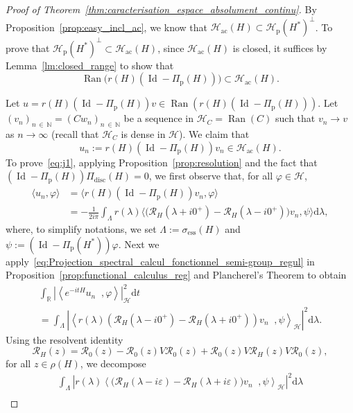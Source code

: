\documentclass[10pt]{amsart}
\theoremstyle{definition}\newtheorem{defi}[theo]{Definition}\newtheorem{rema}[theo]{Remark}\newtheorem{exam}[theo]{Example}\newtheorem{exem}[theo]{Example}\newtheorem{nota}[theo]{Notation}
\newcommand{\Hi}{\mathcal{H}}
\newcommand{\R}{\mathbb{R}}
\newcommand{\N}{\mathbb{N}}
\newcommand{\ess}{\mathrm{ess}}
\newcommand{\rmp}{\mathrm{p}}
\newcommand{\acr}{\mathrm{ac}}
\newcommand{\rmd}{\mathrm{d}}
\newcommand{\disc}{\mathrm{disc}}
\newcommand{\scal}[2]{\left\langle{#1} \middle., {#2}\right\rangle}
\newcommand{\abso}[1]{\left|{#1}\right|}
\newcommand{\Res}{\mathcal{R}}
\DeclareMathOperator{\Ran}{Ran}
\DeclareMathOperator{\Id}{Id}
\begin{document}
\begin{proof}[Proof of Theorem~\ref{thm:caracterisation_espace_absolument_continu}]
By Proposition~\ref{prop:easy_incl_ac}, we know that $\Hi_\acr(H)\subset\Hi_\rmp(H^*)^\perp$. To prove that $\Hi_\rmp(H^*)^\perp\subset\Hi_\acr(H)$, since $\Hi_\acr(H)$ is closed, it suffices by Lemma~\ref{lm:closed_range} to show that
\begin{equation*}
\Ran\big(r(H)\left(\Id-\Pi_\rmp(H)\right)\big)\subset\Hi_\acr(H).
\end{equation*}

Let $u=r(H)(\Id-\Pi_\rmp(H))v \in \Ran(r(H)(\Id-\Pi_\rmp(H)))$. Let $(v_n)_{n\,\in\,\N}=(Cw_n)_{n\,\in\,\N}$ be a sequence in $\Hi_C=\Ran(C)$ such that $v_n\to v$ as $n\to\infty$ (recall that $\Hi_C$ is dense in $\Hi$). We claim that
\begin{equation}\label{eq:j1}
u_n:=r(H)\left(\Id-\Pi_{\rmp}(H)\right)v_n\in\Hi_\acr(H).
\end{equation}
To prove~\eqref{eq:j1}, applying Proposition~\ref{prop:resolution} and the fact that $(\Id-\Pi_{\rmp}(H))\Pi_{\disc}(H)=0$, we first observe that, for all $\varphi\in\Hi$,
\begin{align*}
\langle u_n,\varphi\rangle&=\big\langle r(H)\left(\Id-\Pi_{\rmp}(H)\right)v_n,\varphi\big\rangle\\
&=-\frac{1}{2i\pi}\int_{\Lambda}r(\lambda)\big\langle\big(\Res_{H}\left(\lambda+i0^+\right)-\Res_{H}\left(\lambda-i0^+\right)\big)v_n,\psi\big\rangle\rmd \lambda,
\end{align*}
where, to simplify notations, we set $\Lambda:=\sigma_{\ess}(H)$ and $\psi:=(\Id-\Pi_{\rmp}(H^*))\varphi$. Next we apply~\eqref{eq:Projection_spectral_calcul_fonctionnel_semi-group_regul} in Proposition~\ref{prop:functional_calculus_reg} and Plancherel's Theorem to obtain
\begin{multline}\label{eq:t1}
\int_\R\abso{\scal{e^{-itH}u_n}{\varphi}}_\Hi^2\rmd t\\
=\int_{\Lambda}\abso{\scal{r(\lambda)\left(\Res_H\left(\lambda-i0^+\right)-\Res_H\left(\lambda+i0^+\right)\right)v_n}{\psi}_\Hi}^2\rmd \lambda. 
\end{multline}
Using the resolvent identity
\begin{equation*}
\Res_H(z)=\Res_0(z)-\Res_0(z)V\Res_0(z)+\Res_0(z)V\Res_H(z)V\Res_0(z),
\end{equation*}
for all $z\in\rho(H)$, we decompose
\begin{multline}\label{eq:carac-ses_abso_eq_géné}
\int_{\Lambda}\abso{r(\lambda)\scal{\big(\Res_H(\lambda-i\varepsilon)-\Res_H(\lambda+i\varepsilon)\big)v_n}{\psi}_\Hi}^2\rmd \lambda\\

\end{multline}
\end{proof}
\end{document}
